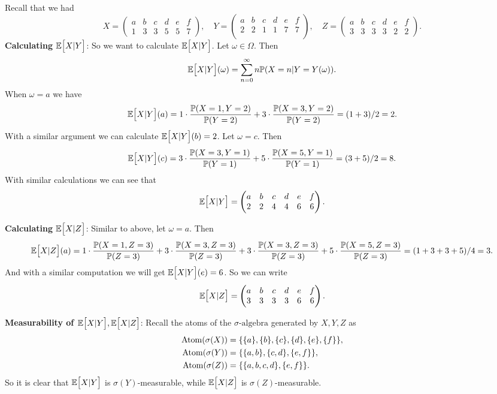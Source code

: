 \begin{solution}
	Recall that we had
	\[ X = \begin{pmatrix}
		a & b & c & d & e & f \\
		1 & 3 & 3 & 5 & 5 & 7
	\end{pmatrix}, \quad
	Y = \begin{pmatrix}
		a & b & c & d & e & f \\
		2 & 2 & 1 & 1 & 7 & 7 \\
	\end{pmatrix},\quad
	Z = \begin{pmatrix}
		a & b & c & d & e & f \\
		3 & 3 & 3 & 3 & 2 & 2
	\end{pmatrix}.
	\]
	\noindent \textbf{Calculating $ \mathbb{E}\big[X|Y\big] $}: So we want to calculate $ \mathbb{E}\big[X|Y\big] $. Let $ \omega \in \Omega $. Then
	\[ \mathbb{E}\big[X|Y\big](\omega) = \sum_{n=0}^{\infty}n\mathbb{P}(X=n|Y=Y(\omega)). \]
	When $ \omega = a $ we have
	\[ \mathbb{E}\big[X|Y\big](a) = 1\cdot\frac{\mathbb{P}(X=1,Y=2)}{\mathbb{P}(Y=2)} + 3\cdot\frac{\mathbb{P}(X=3,Y=2)}{\mathbb{P}(Y=2)} = (1+3)/2 = 2. \]
	With a similar argument we can calculate $ \mathbb{E}\big[X|Y\big](b) = 2 $. Let $ \omega = c $. Then
	\[ \mathbb{E}\big[X|Y\big](c) = 3\cdot\frac{\mathbb{P}(X=3,Y=1)}{\mathbb{P}(Y=1)} + 5\cdot\frac{\mathbb{P}(X=5,Y=1)}{\mathbb{P}(Y=1)} = (3+5)/2 = 8.  \]
	With similar calculations we can see that
	\[ \mathbb{E}\big[X|Y\big] = \begin{pmatrix}
		a & b & c & d & e & f \\
		2 & 2 & 4 & 4 & 6 & 6
	\end{pmatrix}. \]
	
	\noindent \textbf{Calculating $ \mathbb{E}\big[X|Z\big] $}: Similar to above, let $ \omega = a $. Then
	\[ \mathbb{E}\big[X|Z\big](a) = 1\cdot\frac{\mathbb{P}(X=1,Z=3)}{\mathbb{P}(Z=3)} + 3\cdot\frac{\mathbb{P}(X=3,Z=3)}{\mathbb{P}(Z=3)} + 3\cdot\frac{\mathbb{P}(X=3,Z=3)}{\mathbb{P}(Z=3)} + 5\cdot\frac{\mathbb{P}(X=5,Z=3)}{\mathbb{P}(Z=3)} = (1+3+3+5)/4 = 3. \]
	And with a similar computation we will get $ \mathbb{E}\big[X|Y\big](e) = 6 $. So we can write
	\[ \mathbb{E}\big[X|Z\big] = \begin{pmatrix}
		a & b & c & d & e & f \\
		3 & 3 & 3 & 3 & 6 & 6
	\end{pmatrix}. \] 
	
	\noindent \textbf{Measurability of $ \mathbb{E}\big[X|Y\big],\mathbb{E}\big[X|Z\big] $}:
	Recall the atoms of the $\sigma\text{-algebra}$ generated by $ X,Y,Z $ as 
	\begin{align*}
		\operatorname{Atom}(\sigma(X)) &= \{\{a\},\{b\},\{c\},\{d\},\{e\},\{f\}\}, \\
		\operatorname{Atom}(\sigma(Y)) &= \{\{a,b\},\{c,d\},\{e,f\}\}, \\
		\operatorname{Atom}(\sigma(Z)) &= \{\{a,b,c,d\},\{e,f\}\}.
	\end{align*}
	So it is clear that $ \mathbb{E}\big[X|Y\big] $ is $ \sigma(Y) $-measurable, while $ \mathbb{E}\big[X|Z\big] $ is $ \sigma(Z) $-measurable.
	

\end{solution}
